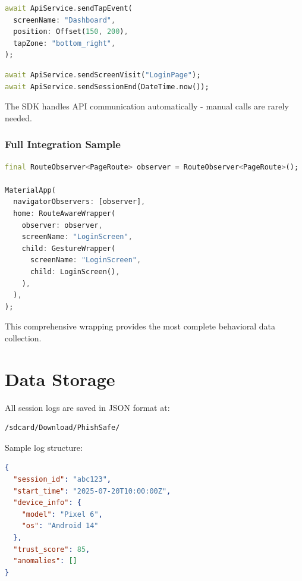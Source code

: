 \documentclass[11pt]{article}
\begin{document}
\begin{lstlisting}[language=Dart]
await ApiService.sendTapEvent(
  screenName: "Dashboard",
  position: Offset(150, 200),
  tapZone: "bottom_right",
);
\end{lstlisting}

\begin{lstlisting}[language=Dart]
await ApiService.sendScreenVisit("LoginPage");
await ApiService.sendSessionEnd(DateTime.now());
\end{lstlisting}

The SDK handles API communication automatically - manual calls are rarely needed.

\subsubsection{Full Integration Sample}

\begin{lstlisting}[language=Dart]
final RouteObserver<PageRoute> observer = RouteObserver<PageRoute>();

MaterialApp(
  navigatorObservers: [observer],
  home: RouteAwareWrapper(
    observer: observer,
    screenName: "LoginScreen",
    child: GestureWrapper(
      screenName: "LoginScreen",
      child: LoginScreen(),
    ),
  ),
);
\end{lstlisting}

This comprehensive wrapping provides the most complete behavioral data collection.


\clearpage
\section{Data Storage}
All session logs are saved in JSON format at:
\begin{lstlisting}
/sdcard/Download/PhishSafe/
\end{lstlisting}

Sample log structure:
\begin{lstlisting}[language=json]
{
  "session_id": "abc123",
  "start_time": "2025-07-20T10:00:00Z",
  "device_info": {
    "model": "Pixel 6",
    "os": "Android 14"
  },
  "trust_score": 85,
  "anomalies": []
}
\end{lstlisting}

\clearpage
\end{document}
